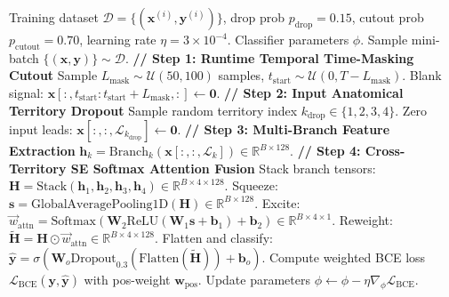 \documentclass[5p,twocolumn,10pt]{elsarticle}
\begin{document}
\begin{algorithm}[!htbp]
\caption{Anatomical Territory-Dropout Classifier Training}
\label{alg:classifier_training}
\begin{algorithmic}[1]
\REQUIRE Training dataset $\mathcal{D} = \{(\mathbf{x}^{(i)}, \mathbf{y}^{(i)})\}$, drop prob $p_{\text{drop}} = 0.15$, cutout prob $p_{\text{cutout}} = 0.70$, learning rate $\eta = 3\times 10^{-4}$.
\ENSURE Classifier parameters $\phi$.
    \STATE Sample mini-batch $\{(\mathbf{x}, \mathbf{y})\} \sim \mathcal{D}$.
    \STATE \textbf{// Step 1: Runtime Temporal Time-Masking Cutout}
        \STATE Sample $L_{\text{mask}} \sim \mathcal{U}(50, 100)$ samples, $t_{\text{start}} \sim \mathcal{U}(0, T - L_{\text{mask}})$.
        \STATE Blank signal: $\mathbf{x}[:, t_{\text{start}} : t_{\text{start}} + L_{\text{mask}}, :] \leftarrow \mathbf{0}$.
    \ENDIF
    \STATE \textbf{// Step 2: Input Anatomical Territory Dropout}
        \STATE Sample random territory index $k_{\text{drop}} \in \{1, 2, 3, 4\}$.
        \STATE Zero input leads: $\mathbf{x}[:, :, \mathcal{L}_{k_{\text{drop}}}] \leftarrow \mathbf{0}$.
    \ENDIF
    \STATE \textbf{// Step 3: Multi-Branch Feature Extraction}
        \STATE $\mathbf{h}_k = \text{Branch}_k(\mathbf{x}[:, :, \mathcal{L}_k]) \in \mathbb{R}^{B \times 128}$.
    \ENDFOR
    \STATE \textbf{// Step 4: Cross-Territory SE Softmax Attention Fusion}
    \STATE Stack branch tensors: $\mathbf{H} = \text{Stack}(\mathbf{h}_1, \mathbf{h}_2, \mathbf{h}_3, \mathbf{h}_4) \in \mathbb{R}^{B \times 4 \times 128}$.
    \STATE Squeeze: $\mathbf{s} = \text{GlobalAveragePooling1D}(\mathbf{H}) \in \mathbb{R}^{B \times 128}$.
    \STATE Excite: $\vec{w}_{\text{attn}} = \text{Softmax}(\mathbf{W}_2 \text{ReLU}(\mathbf{W}_1 \mathbf{s} + \mathbf{b}_1) + \mathbf{b}_2) \in \mathbb{R}^{B \times 4 \times 1}$.
    \STATE Reweight: $\tilde{\mathbf{H}} = \mathbf{H} \odot \vec{w}_{\text{attn}} \in \mathbb{R}^{B \times 4 \times 128}$.
    \STATE Flatten and classify: $\hat{\mathbf{y}} = \sigma\left(\mathbf{W}_o \text{Dropout}_{0.3}(\text{Flatten}(\tilde{\mathbf{H}})) + \mathbf{b}_o\right)$.
    \STATE Compute weighted BCE loss $\mathcal{L}_{\text{BCE}}(\mathbf{y}, \hat{\mathbf{y}})$ with pos-weight $\mathbf{w}_{\text{pos}}$.
    \STATE Update parameters $\phi \leftarrow \phi - \eta \nabla_\phi \mathcal{L}_{\text{BCE}}$.
\ENDWHILE
\end{algorithmic}
\end{algorithm}
\end{document}
